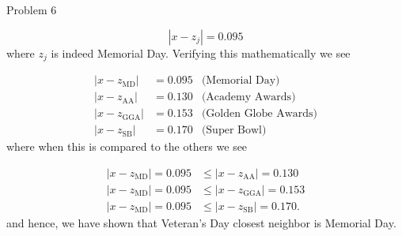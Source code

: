 \begin{problem}{Problem 6}
\begin{highlight}[Solution]
        \begin{equation}
            |x - z_{j}| = 0.095
        \end{equation}
        where $z_{j}$ is indeed Memorial Day. Verifying this mathematically we see

        \begin{align}
            |x - z_{\text{MD}}| & = 0.095 & \text{(Memorial Day)} \\
            |x - z_{\text{AA}}| & = 0.130 & \text{(Academy Awards)} \\
            |x - z_{\text{GGA}}| & = 0.153 & \text{(Golden Globe Awards)} \\
            |x - z_{\text{SB}}| & = 0.170 & \text{(Super Bowl)}
        \end{align}
        where when this is compared to the others we see

        \begin{align}
            |x - z_{\text{MD}}| = 0.095 & \leq |x - z_{\text{AA}}| = 0.130 \\
            |x - z_{\text{MD}}| = 0.095 & \leq |x - z_{\text{GGA}}| = 0.153 \\
            |x - z_{\text{MD}}| = 0.095 & \leq |x - z_{\text{SB}}| = 0.170.
        \end{align}
        and hence, we have shown that Veteran's Day closest neighbor is Memorial Day.
    \end{highlight}
\end{problem}

